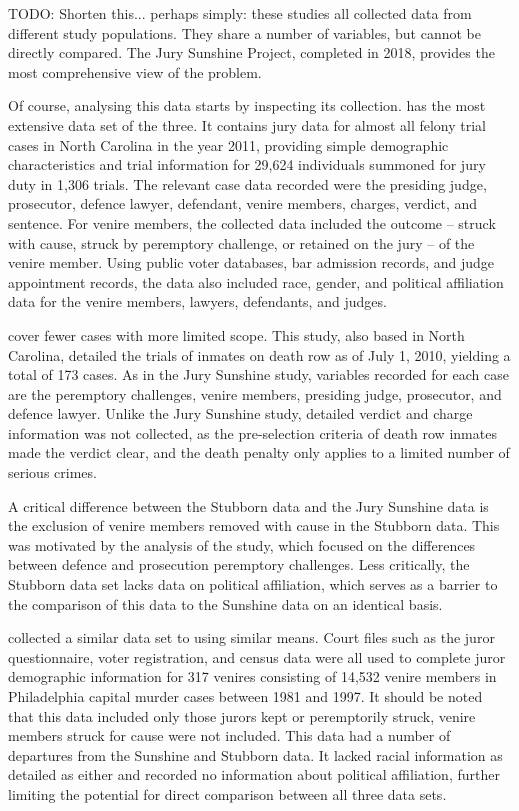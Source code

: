 \documentclass[12pt]{article}
\newcommand{\TODO}[1]{{\color{brickred} TODO:  {#1}}}
\begin{document}
\TODO{Shorten this... perhaps simply: these studies all collected data from different study populations. They share a number of variables, but cannot be directly compared. The Jury Sunshine Project, completed in 2018, provides the most comprehensive view of the problem.}

Of course, analysing this data starts by inspecting its collection. 
\cite{JurySunshineProj} has the most extensive data set of the three. It contains jury data for almost all felony trial cases in North Carolina in the year 2011, providing simple demographic characteristics and trial information for 29,624 individuals summoned for jury duty in 1,306 trials. The relevant case data recorded were the presiding judge, prosecutor, defence lawyer, defendant, venire members, charges, verdict, and sentence. For venire members, the collected data included the outcome -- struck with cause, struck by peremptory challenge, or retained on the jury -- of the venire member. Using public voter databases, bar admission records, and judge appointment records, the data also included race, gender, and political affiliation data for the venire members, lawyers, defendants, and judges.

\cite{StubbornLegacy} cover fewer cases with more limited scope. This study, also based in North Carolina, detailed the trials of inmates on death row as of July 1, 2010, yielding a total of 173 cases. As in the Jury Sunshine study, variables recorded for each case are the peremptory challenges, venire members, presiding judge, prosecutor, and defence lawyer. Unlike the Jury Sunshine study, detailed verdict and charge information was not collected, as the pre-selection criteria of death row inmates made the verdict clear, and the death penalty only applies to a limited number of serious crimes.

A critical difference between the Stubborn data and the Jury Sunshine data is the exclusion of venire members removed with cause in the Stubborn data. This was motivated by the analysis of the study, which focused on the differences between defence and prosecution peremptory challenges. Less critically, the Stubborn data set lacks data on political affiliation, which serves as a barrier to the comparison of this data to the Sunshine data on an identical basis.

\cite{PerempChalMurder} collected a similar data set to \cite{StubbornLegacy} using similar means. Court files such as the juror questionnaire, voter registration, and census data were all used to complete juror demographic information for 317 venires consisting of 14,532 venire members in Philadelphia capital murder cases between 1981 and 1997. It should be noted that this data included only those jurors kept or peremptorily struck, venire members struck for cause were not included. This data had a number of departures from the Sunshine and Stubborn data. It lacked racial information as detailed as either and recorded no information about political affiliation, further limiting the potential for direct comparison between all three data sets.
\end{document}
